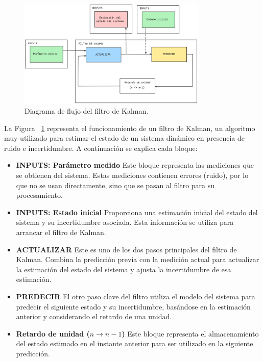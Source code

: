 \documentclass[11pt,spanish,listoffigures,listoftables]{tfgetsinf}
\begin{document}
\begin{figure}[H]
   \centering
   \includegraphics[width=0.8\textwidth]{images/estado_del_arte/filtro_de_kalman.png}
   \caption[Diagrama de flujo del filtro de Kalman]{Diagrama de flujo del filtro de Kalman.}
   \label{fig:filtro_de_kalman}
\end{figure}

La Figura ~\ref{fig:filtro_de_kalman} representa el funcionamiento de un filtro de Kalman, un algoritmo muy utilizado para estimar el estado de un sistema dinámico en presencia de ruido e incertidumbre. A continuación se explica cada bloque:

\begin{itemize}
   \item \textbf{INPUTS: Parámetro medido}
   Este bloque representa las mediciones que se obtienen del sistema. Estas mediciones contienen errores (ruido), por lo que no se usan directamente, sino que se pasan al filtro para su procesamiento.

   \item \textbf{INPUTS: Estado inicial}
   Proporciona una estimación inicial del estado del sistema y su incertidumbre asociada. Esta información se utiliza para arrancar el filtro de Kalman.

   \item \textbf{ACTUALIZAR}
   Este es uno de los dos pasos principales del filtro de Kalman. Combina la predicción previa con la medición actual para actualizar la estimación del estado del sistema y ajusta la incertidumbre de esa estimación.

   \item \textbf{PREDECIR}
   El otro paso clave del filtro utiliza el modelo del sistema para predecir el siguiente estado y su incertidumbre, basándose en la estimación anterior y considerando el retardo de una unidad.
   \item \textbf{Retardo de unidad (\(n \rightarrow n{-}1\))}
   Este bloque representa el almacenamiento del estado estimado en el instante anterior para ser utilizado en la siguiente predicción.
\end{itemize}
\end{document}
